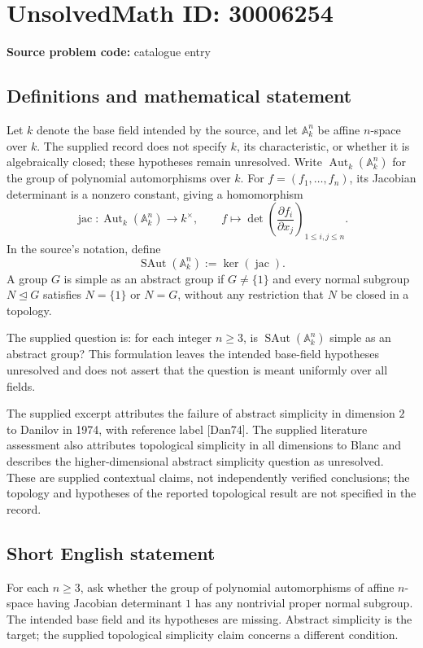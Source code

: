 \documentclass[11pt]{article}
\begin{document}
\section*{UnsolvedMath ID: 30006254}
\textbf{Source problem code:} catalogue entry
\subsection{Definitions and mathematical statement}
Let \(k\) denote the base field intended by the source, and let \(\mathbb A_k^n\) be affine \(n\)-space over \(k\). The supplied record does not specify \(k\), its characteristic, or whether it is algebraically closed; these hypotheses remain unresolved. Write \(\operatorname{Aut}_k(\mathbb A_k^n)\) for the group of polynomial automorphisms over \(k\). For \(f=(f_1,\ldots,f_n)\), its Jacobian determinant is a nonzero constant, giving a homomorphism
\[
\operatorname{jac}\colon \operatorname{Aut}_k(\mathbb A_k^n)\longrightarrow k^\times,
\qquad f\longmapsto \det\!\left(\frac{\partial f_i}{\partial x_j}\right)_{1\leq i,j\leq n}.
\]
In the source's notation, define
\[
\operatorname{SAut}(\mathbb A_k^n):=\ker(\operatorname{jac}).
\]
A group \(G\) is simple as an abstract group if \(G\neq\{1\}\) and every normal subgroup \(N\trianglelefteq G\) satisfies \(N=\{1\}\) or \(N=G\), without any restriction that \(N\) be closed in a topology.

The supplied question is: for each integer \(n\geq3\), is \(\operatorname{SAut}(\mathbb A_k^n)\) simple as an abstract group? This formulation leaves the intended base-field hypotheses unresolved and does not assert that the question is meant uniformly over all fields.

The supplied excerpt attributes the failure of abstract simplicity in dimension \(2\) to Danilov in 1974, with reference label [Dan74]. The supplied literature assessment also attributes topological simplicity in all dimensions to Blanc and describes the higher-dimensional abstract simplicity question as unresolved. These are supplied contextual claims, not independently verified conclusions; the topology and hypotheses of the reported topological result are not specified in the record.
\subsection{Short English statement}
For each \(n\geq3\), ask whether the group of polynomial automorphisms of affine \(n\)-space having Jacobian determinant \(1\) has any nontrivial proper normal subgroup. The intended base field and its hypotheses are missing. Abstract simplicity is the target; the supplied topological simplicity claim concerns a different condition.
\end{document}
